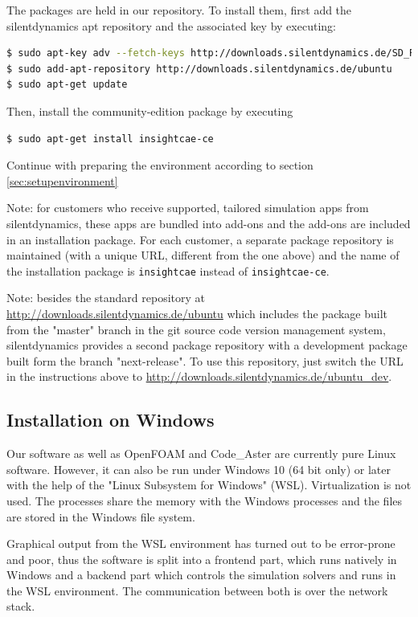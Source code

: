 The packages are held in our repository. To install them, first add the silentdynamics apt repository and the associated key by executing:

\begin{lstlisting}[language=bash]
$ sudo apt-key adv --fetch-keys http://downloads.silentdynamics.de/SD_REPOSITORIES_PUBLIC_KEY.gpg
$ sudo add-apt-repository http://downloads.silentdynamics.de/ubuntu
$ sudo apt-get update
\end{lstlisting}

Then, install the community-edition package by executing

\begin{lstlisting}[language=bash]
$ sudo apt-get install insightcae-ce
\end{lstlisting}

Continue with preparing the environment according to section \ref{sec:setupenvironment}

Note: for customers who receive supported, tailored simulation apps from silentdynamics, these apps are bundled into add-ons and the add-ons are included in an installation package.
For each customer, a separate package repository is maintained (with a unique URL, different from the one above) and the name of the installation package is \texttt{insightcae} instead of \texttt{insightcae-ce}.

Note: besides the standard repository at \url{http://downloads.silentdynamics.de/ubuntu} which includes the package built from the "master" branch in the git source code version management system, silentdynamics provides a second package repository with a development package built form the branch "next-release".
To use this repository, just switch the URL in the instructions above to
\url{http://downloads.silentdynamics.de/ubuntu_dev}.

\subsection{Installation on Windows}
Our software as well as OpenFOAM and Code\_Aster are currently pure Linux software. 
However, it can also be run under Windows 10 (64 bit only) or later with the help of the "Linux Subsystem for Windows" (WSL).
Virtualization is not used. 
The processes share the memory with the Windows processes and the files are stored in the Windows file system. 

Graphical output from the WSL environment has turned out to be error-prone and poor, thus the software is split into a frontend part, which runs natively in Windows and a backend part which controls the simulation solvers and runs in the WSL environment.
The communication between both is over the network stack.

